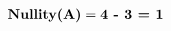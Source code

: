 \documentclass[preview]{standalone}
\begin{document}
\begin{align*}
\textbf{\text{Nullity}(A)} = \textbf{\text{4} -  \textbf{3} = 1}
\end{align*}
\end{document}
